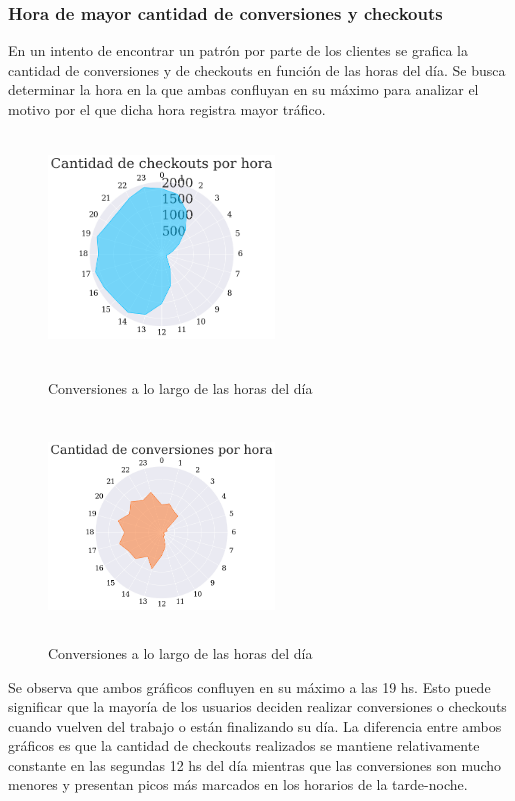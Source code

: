 \documentclass[a4paper]{article}
\begin{document}
\subsubsection{Hora de mayor cantidad de conversiones y checkouts}

En un intento de encontrar un patrón por parte de los clientes se grafica la cantidad de conversiones y de checkouts en función de las horas del día. Se busca determinar la hora en la que ambas confluyan en su máximo para analizar el motivo por el que dicha hora registra mayor tráfico.

\begin{figure}[!h]
	\centering
	\begin{minipage}[b]{0.4\textwidth}
		\includegraphics[width=6cm,height=6cm,keepaspectratio]{figures/041-hours-checkout-radarchart.png}
		\caption{Conversiones a lo largo de las horas del día}
	\end{minipage}
	\hfill
	\begin{minipage}[b]{0.4\textwidth}
		\includegraphics[width=6cm,height=6cm,keepaspectratio]{figures/040-hours-conversion-radarchart.png}
		\caption{Conversiones a lo largo de las horas del día}
	\end{minipage}
\end{figure}

Se observa que ambos gráficos confluyen en su máximo a las 19 hs. Esto puede significar que la mayoría de los usuarios deciden realizar conversiones o checkouts cuando vuelven del trabajo o están finalizando su día. La diferencia entre ambos gráficos es que la cantidad de checkouts realizados se mantiene relativamente constante en las segundas 12 hs del día mientras que las conversiones son mucho menores y presentan picos más marcados en los horarios de la tarde-noche. 
\end{document}
